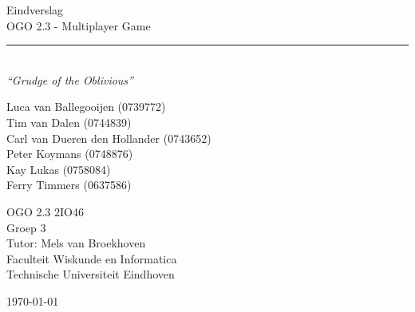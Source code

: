 \begin{titlepage}
	\begin{center}
		
		{\Huge Eindverslag \\[0.5cm]OGO 2.3 - Multiplayer Game}\\[0.5cm]
		\rule{\linewidth}{0.5mm}\\[0.5cm]
				\bigskip
		\huge \textit{``Grudge of the Oblivious''}
		
		{\Large
		Luca van Ballegooijen (0739772)\\
        Tim van Dalen (0744839)\\
		Carl van Dueren den Hollander (0743652)\\
        Peter Koymans (0748876)\\
		Kay Lukas (0758084)\\
        Ferry Timmers (0637586)\\[1cm]
		}
		
		{\large
		OGO 2.3 2IO46\\
		Groep 3 \\
        Tutor: Mels van Broekhoven\\[1cm]
		Faculteit Wiskunde en Informatica\\
		Technische Universiteit Eindhoven\\[1cm]
		}
		
		

		\vfill

		{\large \today}
	\end{center}
\end{titlepage}
